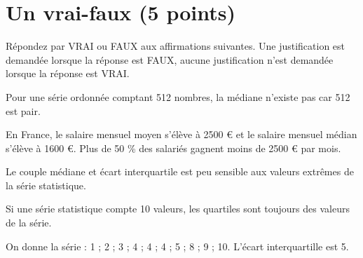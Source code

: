 \section{Un vrai-faux (5 points)}

Répondez par VRAI ou FAUX aux affirmations suivantes. Une justification est demandée lorsque la réponse est FAUX, aucune justification n'est demandée lorsque la réponse est VRAI.

\begin{questions}
	\question[1] Pour une série ordonnée comptant 512 nombres, la médiane n'existe pas car 512 est pair.
	
	\question[1] En France, le salaire mensuel moyen s'élève à \num{2500} € et le salaire mensuel médian s'élève à \num{1600} €. Plus de 50 \% des salariés gagnent moins de \num{2500} € par mois.
	
	\question[1] Le couple médiane et écart interquartile est peu sensible aux valeurs extrêmes de la série statistique.
	
	
	\question[1] Si une série statistique compte 10 valeurs, les quartiles sont toujours des valeurs de la série.
	
	\question[1] On donne la série : 1 ; 2 ; 3 ; 4 ; 4 ; 4 ; 5 ; 8 ; 9 ; 10. L'écart interquartille est 5.
\end{questions}